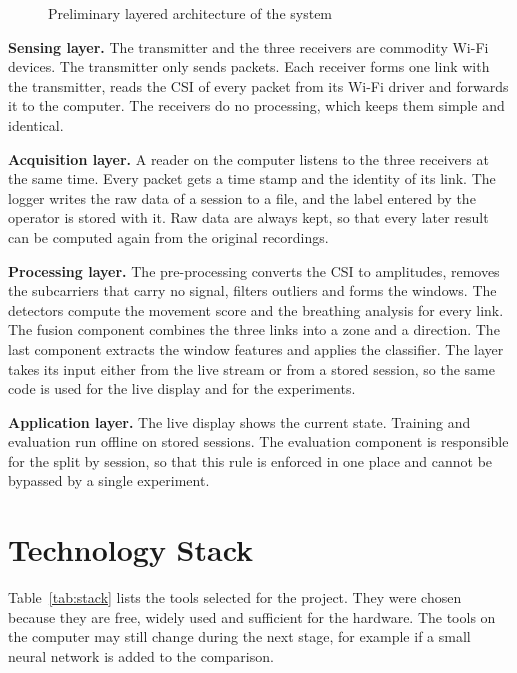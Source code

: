 \begin{figure}[htbp]
\caption{Preliminary layered architecture of the system}
\label{fig:architecture}
\end{figure}

\textbf{Sensing layer.} The transmitter and the three receivers are commodity Wi-Fi devices. The transmitter only sends packets. Each receiver forms one link with the transmitter, reads the CSI of every packet from its Wi-Fi driver and forwards it to the computer. The receivers do no processing, which keeps them simple and identical.

\textbf{Acquisition layer.} A reader on the computer listens to the three receivers at the same time. Every packet gets a time stamp and the identity of its link. The logger writes the raw data of a session to a file, and the label entered by the operator is stored with it. Raw data are always kept, so that every later result can be computed again from the original recordings.

\textbf{Processing layer.} The pre-processing converts the CSI to amplitudes, removes the subcarriers that carry no signal, filters outliers and forms the windows. The detectors compute the movement score and the breathing analysis for every link. The fusion component combines the three links into a zone and a direction. The last component extracts the window features and applies the classifier. The layer takes its input either from the live stream or from a stored session, so the same code is used for the live display and for the experiments.

\textbf{Application layer.} The live display shows the current state. Training and evaluation run offline on stored sessions. The evaluation component is responsible for the split by session, so that this rule is enforced in one place and cannot be bypassed by a single experiment.

\section{Technology Stack}
Table~\ref{tab:stack} lists the tools selected for the project. They were chosen because they are free, widely used and sufficient for the hardware. The tools on the computer may still change during the next stage, for example if a small neural network is added to the comparison.

